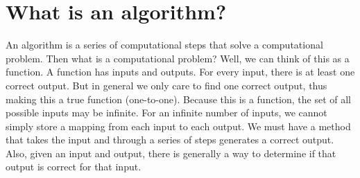 \documentclass{article}\usepackage[]{graphicx}\usepackage[]{xcolor}
\begin{document}
\section*{What is an algorithm?}

An algorithm is a series of computational steps that solve a computational problem. Then what is a computational problem? Well, we can think of this as a function. A function has inputs and outputs. For every input, there is at least one correct output. But in general we only care to find one correct output, thus making this a true function (one-to-one). Because this is a function, the set of all possible inputs may be infinite. For an infinite number of inputs, we cannot simply store a mapping from each input to each output. We must have a method that takes the input and through a series of steps generates a correct output. Also, given an input and output, there is generally a way to determine if that output is correct for that input. 
\end{document}
